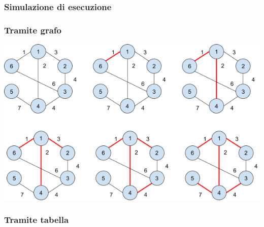 \documentclass{article}
\begin{document}
\hypertarget{h.4n5zx1ni4b2b}{\subsubsection{\texorpdfstring{{Simulazione
di esecuzione}}{Simulazione di esecuzione}}\label{h.4n5zx1ni4b2b}}

\subsubsection{Tramite grafo}

{\includegraphics{images/image519.png}}

\subsubsection{Tramite tabella}

\protect\hypertarget{t.3d51b92c2ac905672959a85df610c27b5dc51a6c}{}{}\protect\hypertarget{t.43}{}{}
\end{document}
